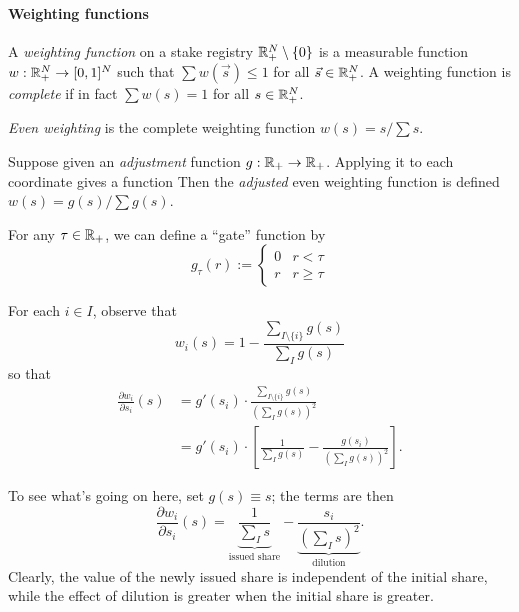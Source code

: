 \paragraph{Weighting functions}

\begin{definition}

  A \emph{weighting function} on a stake registry $\mathbb{R}_+^N\setminus\{0\}$ is a measurable function $w:\mathbb{R}_+^N\rightarrow[0,1]^N$ such that $\sum w(\vec{s}) \leq 1$ for all $\vec{s}\in \mathbb{R}_+^N$.
  A weighting function is \emph{complete} if in fact $\sum w(s) = 1$ for all $s\in \mathbb{R}_+^N$.

\end{definition}

\begin{example}
  \emph{Even weighting} is the complete weighting function $w(s) = s/\sum s$.
\end{example}


\begin{example}

  Suppose given an \emph{adjustment} function $g:\mathbb{R}_+\rightarrow\mathbb{R}_+$. 
  Applying it to each coordinate gives a function
  Then the \emph{adjusted} even weighting function is defined $w(s) = g(s)/\sum g(s)$.

\end{example}

\begin{example}
  For any $\tau\in\mathbb{R}_+$, we can define a ``gate'' function by
  \[
    g_\tau(r) := \left\{\begin{array}{ll} 0 & r<\tau \\ r & r\geq\tau\end{array}\right.
  \]
\end{example}

For each $i\in I$, observe that
\[
  w_i(s) = 1 - \frac{\sum_{I\setminus\{i\}}g(s)}{\sum_I g(s)}
\]
so that
\begin{align*}
  \frac{\partial w_i}{\partial s_i}(s) &= g'(s_i)\cdot \frac{\sum_{I\setminus\{i\}}g(s)}{(\sum_I g(s))^2} \\
  &=g'(s_i)\cdot\left[ \frac{1}{\sum_I g(s)} - \frac{g(s_i)}{(\sum_I g(s))^2} \right].
\end{align*}

To see what's going on here, set $g(s)\equiv s$; the terms are then
\[
  \frac{\partial w_i}{\partial s_i}(s)=
  \underbrace{\frac{1}{\sum_I s}}_{\text{issued share}} - \underbrace{\frac{s_i}{(\sum_I s)^2}}_{\text{dilution}} .
\]
Clearly, the value of the newly issued share is independent of the initial share, while the effect of dilution is greater when the initial share is greater.

